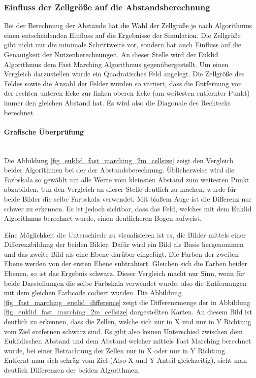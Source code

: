 \subsubsection{Einfluss der Zellgröße auf die Abstandsberechnung}
Bei der Berechnung der Abstände hat die Wahl der Zellgröße je nach Algorithmus einen entscheidenden Einfluss auf die Ergebnisse der Simulation. Die Zellgröße gibt nicht nur die minimale Schrittweite vor, sondern hat auch Einfluss auf die Genauigkeit der Nutzenberechnungen. An dieser Stelle wird der Euklid Algorithmus dem Fast Marching Algorithmus gegenübergestellt. Um einen Vergleich darzustellen wurde ein Quadratisches Feld angelegt. Die Zellgröße des Feldes sowie die Anzahl der Felder wurden so variiert, dass die Entfernung von der rechten unteren Ecke zur linken oberen Ecke (am weitesten entfernter Punkt) immer den gleichen Abstand hat. Es wird also die Diagonale des Rechtecks berechnet. 

\paragraph{Grafische Überprüfung}\\
Die Abbildung \ref{fig_euklid_fast_marching_2m_cellsize} zeigt den Vergleich beider Algorithmen bei der der Abstandsberechnung. Üblicherweise wird die Farbskala so gewählt um alle Werte vom kleinsten Abstand zum weitesten Punkt abzubilden. Um den Vergleich an dieser Stelle deutlich zu machen, wurde für beide Bilder die selbe Farbskala verwendet. Mit bloßem Auge ist die Differenz nur schwer zu erkennen. Es ist jedoch sichtbar, dass das Feld, welches mit dem Euklid Algorithmus berechnet wurde, einen deutlicheren Bogen aufweist. 

Eine Möglichkeit die Unterschiede zu visualisieren ist es, die Bilder mittels einer Differenzbildung der beiden Bilder. Dafür wird ein Bild als Basis hergenommen und das zweite Bild als eine Ebene darüber eingefügt. Die Farben der zweiten Ebene werden von der ersten Ebene subtrahiert. Gleichen sich die Farben beider Ebenen, so ist das Ergebnis schwarz. Dieser Vergleich macht nur Sinn, wenn für beide Darstellungen die selbe Farbskala verwendet wurde, also die Entfernungen mit dem gleichen Farbcode codiert wurden. Die Abbildung \ref{fig_fast_marching_euclid_difference} zeigt die Differenzmenge der in Abbildung \ref{fig_euklid_fast_marching_2m_cellsize} dargestellten Karten.
An diesem Bild ist deutlich zu erkennen, dass die Zellen, welche sich nur in X und nur in Y Richtung vom Ziel entfernen schwarz sind.  Es gibt also keinen Unterschied zwischen dem Euklidischen Abstand und dem Abstand welcher mittels Fast Marching berechnet wurde, bei einer Betrachtung der Zellen nur in X oder nur in Y Richtung. Entfernt man sich schräg vom Ziel (Also X und Y Anteil gleichzeitig), sieht man deutlich Differenzen der beiden Algorithmen. 

